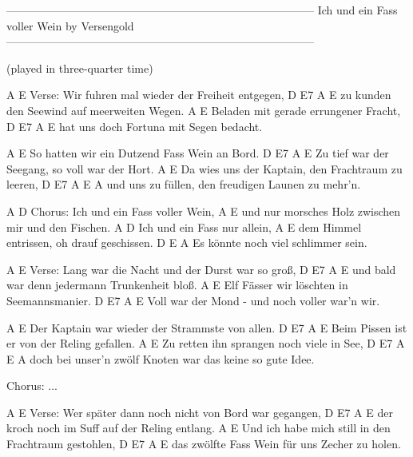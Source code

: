 -----------------------------------------------------------------------------------
                  Ich und ein Fass voller Wein  by  Versengold
-----------------------------------------------------------------------------------

(played in three-quarter time)

            A                     E
Verse:  Wir fuhren mal wieder der Freiheit entgegen,
           D          E7          A          E
        zu kunden den Seewind auf meerweiten Wegen.
          A                  E
        Beladen mit gerade errungener Fracht,
            D           E7       A       E
        hat uns doch Fortuna mit Segen bedacht.

           A                      E
        So hatten wir ein Dutzend Fass Wein an Bord.
           D            E7          A            E
        Zu tief war der Seegang, so voll war der Hort.
           A                         E
        Da wies uns der Kaptain, den Frachtraum zu leeren,
            D      E7          A         E         A
        und uns zu füllen, den freudigen Launen zu mehr'n.


        A                       D
Chorus: Ich und ein Fass voller Wein,
                A                      E
        und nur morsches Holz zwischen mir und den Fischen.
        A                    D
        Ich und ein Fass nur allein,
            A                 E
        dem Himmel entrissen, oh drauf geschissen.
           D           E              A
        Es könnte noch viel schlimmer sein.


             A                     E
Verse:  Lang war die Nacht und der Durst war so groß,
            D             E7        A           E
        und bald war denn jedermann Trunkenheit bloß.
            A                      E
        Elf Fässer wir löschten in Seemannsmanier.
        D            E7              A            E
        Voll war der Mond - und noch voller war'n wir.


            A                      E
        Der Kaptain war wieder der Strammste von allen.
             D          E7         A        E
        Beim Pissen ist er von der Reling gefallen.
           A                        E
        Zu retten ihn sprangen noch viele in See,
                 D             E7             A        E      A
        doch bei unser'n zwölf Knoten war das keine so gute Idee.


Chorus: ...


            A                          E
Verse:  Wer später dann noch nicht von Bord war gegangen,
            D             E7           A         E
        der kroch noch im Suff auf der Reling entlang.
            A                          E
        Und ich habe mich still in den Frachtraum gestohlen,
            D            E7           A         E
        das zwölfte Fass Wein für uns Zecher zu holen.


